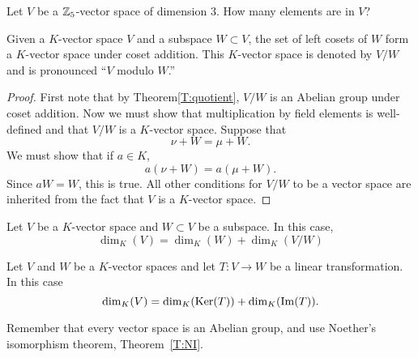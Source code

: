 \documentclass{ximera}
\begin{document}
\begin{exercise}
  Let $V$ be a $\mathbb Z_5$-vector space of dimension $3$. How many elements
  are in $V$?
\end{exercise}



\begin{theorem}
  Given a $K$-vector space $V$ and a subspace $W\subset V$, the set of
  left cosets of $W$ form a $K$-vector space under coset
  addition. This $K$-vector space is denoted by $V/W$ and is
  pronounced ``$V$ modulo $W$.''
  \begin{proof}
    First note that by Theorem\ref{T:quotient}, $V/W$ is an Abelian
    group under coset addition. Now we must show that multiplication
    by field elements is well-defined and that
    $V/W$ is a $K$-vector space. Suppose that
    \[
    \nu + W = \mu + W.
    \]
    We must show that if $a\in K$,
    \[
    a(\nu + W) = a(\mu + W).
    \]
    Since $aW = W$, this is true. All other conditions for $V/W$ to be
    a vector space are inherited from the fact that $V$ is a $K$-vector
    space.
  \end{proof}
\end{theorem}

\begin{corollary}
  Let $V$ be a $K$-vector space and $W\subset V$ be a subspace. In
  this case,
  \[
  \dim_K(V) = \dim_K(W) + \dim_K(V/W)
  \]
\end{corollary}



\begin{corollary}
  Let $V$ and $W$ be a $K$-vector spaces and let $T:V\to W$ be a
  linear transformation. In this case
  \[
  \dim_K(V) = \dim_K(\mathop{\mathrm{Ker}}\nolimits(T)) + \dim_K(\operatorname{Im}(T)).
  \]
  \begin{sketch}
    Remember that every vector space is an Abelian group, and use
    Noether's isomorphism theorem, Theorem~\ref{T:NI}.
  \end{sketch}
\end{corollary}
\end{document}
